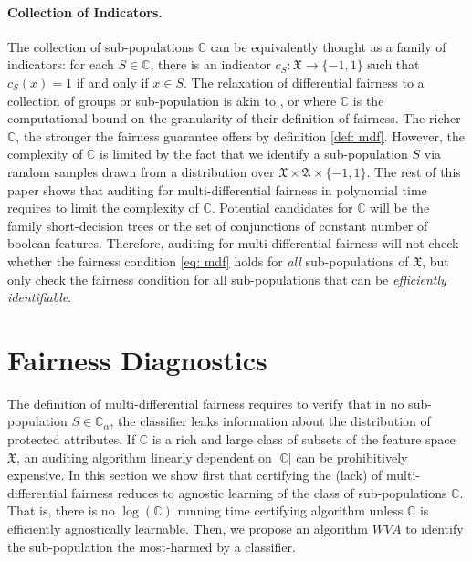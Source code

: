 \documentclass{article}
\begin{document}
\paragraph{Collection of Indicators.}
The collection of sub-populations $\mathbb{C}$ can be equivalently thought as a family of indicators: for each $S\in \mathbb{C}$, there is an indicator $c_{S}: \mathfrak{X}\rightarrow \{-1, 1\}$ such that $c_{S}(x)=1$ if and only if $x\in S$. The relaxation of differential fairness to a collection of groups or sub-population is akin to \cite{kim2018fairness}, \cite{kearns2017preventing} or \cite{hebert2017calibration} where $\mathbb{C}$ is the computational bound on the granularity of their definition of fairness. The richer $\mathbb{C}$, the stronger the fairness guarantee offers by definition \ref{def: mdf}. However, the complexity of $\mathbb{C}$ is limited by the fact that we identify a sub-population $S$ via random samples drawn from a distribution over $\mathfrak{X} \times \mathfrak{A}\times \{-1, 1\}$. The rest of this paper shows that auditing for multi-differential fairness in polynomial time requires to limit the complexity of $\mathbb{C}$. Potential candidates for $\mathbb{C}$ will be the family short-decision trees or the set of conjunctions of constant number of boolean features. Therefore, auditing for multi-differential fairness will not check whether the fairness condition \eqref{eq: mdf} holds for \textit{all} sub-populations of $\mathfrak{X}$, but only check  the fairness condition for all sub-populations that can be \textit{efficiently identifiable}. 


\section{Fairness Diagnostics}

The definition of multi-differential fairness requires to verify that in no sub-population $S\in \mathbb{C}_{\alpha}$, the classifier leaks information about the distribution of protected attributes. If $\mathbb{C}$ is a rich and large class of subsets of the feature space $\mathfrak{X}$, an auditing algorithm linearly dependent on $|\mathbb{C}|$ can be prohibitively expensive. In this section we show first that certifying the (lack) of multi-differential fairness reduces to agnostic learning of the class of sub-populations $\mathbb{C}$. That is, there is no $\log(\mathbb{C})$ running time certifying algorithm unless $\mathbb{C}$ is efficiently agnostically learnable. Then, we propose an algorithm $WVA$ to identify the sub-population the most-harmed by a classifier.   
\end{document}
